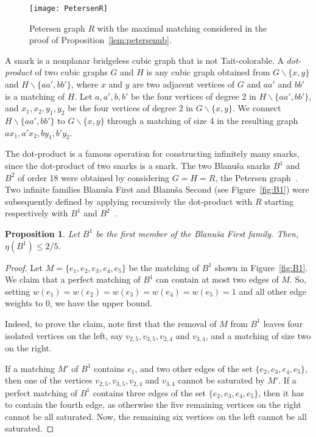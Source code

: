 \documentclass{article}
\newtheorem{proposition}[thm]{Proposition}
\begin{document}
\begin{figure}[ht]
\centering
\texttt{[image: PetersenR]}
\caption{Petersen graph $R$ with the maximal matching considered in the proof of Proposition~\ref{lem:petersenub}.} 
\label{fig:petersen}
\end{figure}

A snark is a nonplanar bridgeless cubic graph that is not Tait-colorable. A \emph{dot-product} of two cubic graphs $G$ and $H$ is any cubic graph obtained from $G\smallsetminus \{x,y\}$ and $H\smallsetminus \{aa', bb'\}$, where $x$ and $y$ are two adjacent vertices of $G$ and $aa'$ and $bb'$ is a matching of $H$. Let $a,a',b,b'$ be the four vertices of degree 2 in $H\smallsetminus \{aa', bb'\}$, and $x_1,x_2,y_1,y_2$ be the four vertices of degree 2 in $G\smallsetminus \{x,y\}$. We connect $H\smallsetminus \{aa', bb'\}$ to $G\smallsetminus \{x,y\}$ through a matching of size 4 in the resulting graph $ax_1,a'x_2,by_1,b'y_2$.

The dot-product is a famous operation for constructing infinitely many snarks, since the dot-product of two snarks is a snark. The two Blanu\v{s}a snarks $B^1$ and $B^2$ of order 18 were obtained by considering $G=H=R$, the Petersen graph~\cite{Blanusa}. Two infinite families Blanu\v{s}a First and Blanu\v{s}a Second (see Figure~\ref{fig:B1}) were subsequently defined by applying recursively the dot-product with $R$ starting respectively with $B^1$ and $B^2$~\cite{Watkins}.

\begin{proposition}\label{B1}
Let $B^1$ be the first member of the Blanu\v{s}a First family. Then, $\eta(B^1) \leq 2/5$.
\end{proposition}
\begin{proof}
Let $M=\{e_1,e_2,e_3,e_4,e_5\}$ be the matching of $B^1$ shown in Figure~\ref{fig:B1}. We claim that a perfect matching of $B^1$ can contain at most two edges of $M$. So, setting $w(e_1)=w(e_2)=w(e_3)=w(e_4)=w(e_5)=1$ and all other edge weights to $0$, we have the upper bound.

Indeed, to prove the claim, note first that the removal of $M$ from $B^1$
leaves four isolated vertices on the left, say $v_{2,5}, v_{3,5}, v_{2,4} $ and $v_{3,4}$,
and a matching of size two on the right.

If a matching $M'$ of $B^1$ contains $e_1$, and two other edges of the set
$\{e_2, e_3, e_4, e_5\}$,
then one of the vertices $v_{2,5}, v_{3,5}, v_{2,4} $ and $v_{3,4}$ cannot be saturated by $M'$.
If a perfect matching of $B^1$ contains three edges of the set $\{e_2, e_3,
e_4, e_5\}$, then it has to contain the fourth edge,
as otherwise the five remaining vertices on the right cannot be all
saturated. Now, the remaining six vertices on the left cannot be all
saturated.
\end{proof}
\end{document}
